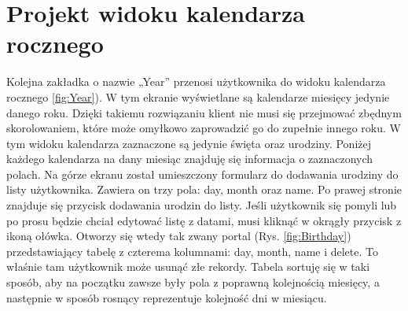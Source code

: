 \section{Projekt widoku kalendarza rocznego}
Kolejna zakładka o nazwie „Year” przenosi użytkownika do widoku kalendarza rocznego \ref{fig:Year}). W tym ekranie wyświetlane są kalendarze miesięcy jedynie danego roku. Dzięki takiemu rozwiązaniu klient nie musi się przejmować zbędnym skorolowaniem, które może omyłkowo zaprowadzić go do zupełnie innego roku. W tym widoku kalendarza zaznaczone są jedynie święta oraz urodziny. Poniżej każdego kalendarza na dany miesiąc znajduję się informacja o zaznaczonych polach. Na górze ekranu został umieszczony formularz do dodawania urodziny do listy użytkownika. Zawiera on trzy pola: day, month oraz name. Po prawej stronie znajduje się przycisk dodawania urodzin do listy. Jeśli użytkownik się pomyli lub
po prosu będzie chciał edytować listę z datami, musi kliknąć w okrągły przycisk z ikoną ołówka. Otworzy się wtedy tak zwany portal (Rys. \ref{fig:Birthday}) przedstawiający tabelę z czterema kolumnami: day, month, name i delete. To właśnie tam użytkownik może usunąć złe rekordy. Tabela sortuję się w taki sposób, aby na początku zawsze były pola z poprawną kolejnością miesięcy, a następnie w sposób rosnący reprezentuje kolejność dni w miesiącu.

